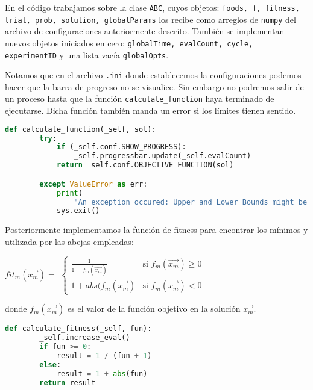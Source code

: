 \documentclass{article}
\begin{document}
En el código trabajamos sobre la clase \texttt{ABC}, cuyos objetos: \texttt{foods, f, fitness, trial, prob, solution, globalParams} los recibe como arreglos de \texttt{numpy} del archivo de configuraciones anteriormente descrito. También se implementan nuevos objetos iniciados en cero: \texttt{globalTime, evalCount, cycle, experimentID} y una lista vacía \texttt{globalOpts}.


Notamos que en el archivo \texttt{.ini} donde establecemos la configuraciones podemos hacer que la barra de progreso no se visualice. Sin embargo no podremos salir de un proceso hasta que la función \texttt{calculate\_function} haya terminado de ejecutarse. Dicha función también manda un error si los límites tienen sentido. 



\begin{lstlisting}[language=Python]
    def calculate_function(_self, sol):
        try:
            if (_self.conf.SHOW_PROGRESS):
                _self.progressbar.update(_self.evalCount)
            return _self.conf.OBJECTIVE_FUNCTION(sol)

        except ValueError as err:
            print(
                "An exception occured: Upper and Lower Bounds might be wrong. (" + str(err) + " in calculate_function)")
            sys.exit()
\end{lstlisting}


Posteriormente implementamos la función de fitness para encontrar los mínimos y utilizada por las abejas empleadas:

    \begin{center}
    $fit_m(\vec{x_m})=$
    \begin{math}
      \left\{
        \begin{array}{ll}
          \frac{1}{1=f_m(\vec{x_m})} & \mbox{si $f_m(\vec{x_m}) \geq 0$}\\
          1+abs(f_m(\vec{x_m}) & \mbox{si $f_m(\vec{x_m}) < 0$}
        \end{array}
      \right.
    \end{math}
    \end{center}
    donde $f_m(\vec{x_m})$ es el valor de la función objetivo en la solución $\vec{x_m}$.

\begin{lstlisting}[language=Python]
    def calculate_fitness(_self, fun):
        _self.increase_eval()
        if fun >= 0:
            result = 1 / (fun + 1)
        else:
            result = 1 + abs(fun)
        return result
\end{lstlisting}
\end{document}
